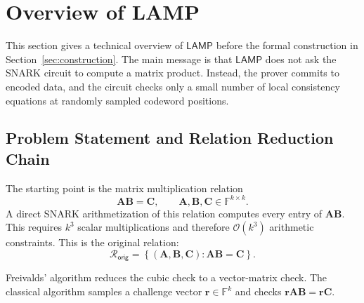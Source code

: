 \documentclass[conference,compsoc]{IEEEtran}
\newcommand{\mat}{\mathbf}          %
\newcommand{\vect}{\mathbf}         %
\newcommand{\relation}{{\mathcal{R}}}
\newcommand{\protocol}{\textsf{LAMP}}   %
\theoremstyle{plain}
\theoremstyle{definition}
\theoremstyle{remark}
\begin{document}

\section{Overview of LAMP}
\label{sec:tech-overview}

This section gives a technical overview of \(\protocol\) before the formal
construction in Section~\ref{sec:construction}.  The main message is that
\(\protocol\) does not ask the SNARK circuit to compute a matrix product.
Instead, the prover commits to encoded data, and the circuit checks only a
small number of local consistency equations at randomly sampled codeword
positions.

\subsection{Problem Statement and Relation Reduction Chain}
\label{sec:overview-reduction-chain}

The starting point is the matrix multiplication relation
\[
  \mat{A}\mat{B}=\mat{C},
  \qquad
  \mat{A},\mat{B},\mat{C}\in\mathbb{F}^{k\times k}.
\]
A direct SNARK arithmetization of this relation computes every entry of
\(\mat{A}\mat{B}\).  This requires \(k^3\) scalar multiplications and therefore
\(\mathcal{O}(k^3)\) arithmetic constraints.  This is the original relation:
\[
\relation_{\mathsf{orig}}
=
\left\{
(\mat{A},\mat{B},\mat{C}) :
\mat{A}\mat{B}=\mat{C}
\right\}.
\]

Freivalds' algorithm reduces the cubic check to a vector-matrix check.  The
classical algorithm samples a challenge vector \(\vect{r}\in\mathbb{F}^k\) and checks
  $\vect{r}\mat{A}\mat{B}
  =
  \vect{r}\mat{C}.$
\end{document}

